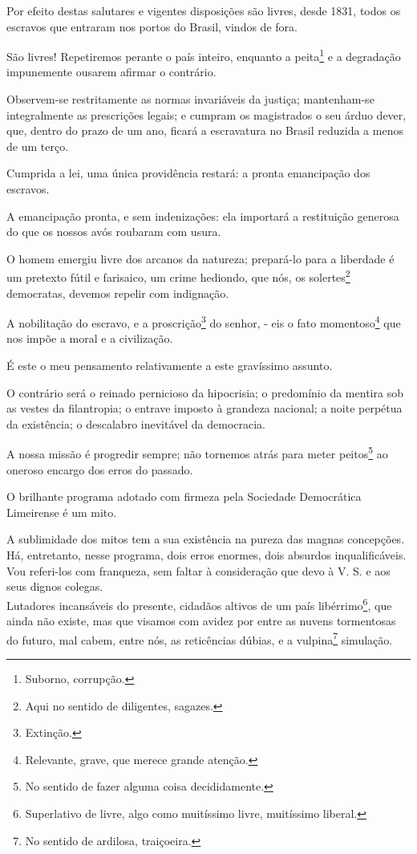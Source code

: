 Por efeito destas salutares e vigentes disposições são livres, desde
1831, todos os escravos que entraram nos portos do Brasil, vindos de
fora.

São livres! Repetiremos perante o país inteiro, enquanto a
peita\footnote{Suborno, corrupção.} e a degradação impunemente ousarem
afirmar o contrário.

Observem-se restritamente as normas invariáveis da justiça; mantenham-se
integralmente as prescrições legais; e cumpram os magistrados o seu
árduo dever, que, dentro do prazo de um ano, ficará a escravatura no
Brasil reduzida a menos de um terço.

Cumprida a lei, uma única providência restará: a pronta emancipação dos
escravos.

A emancipação pronta, e sem indenizações: ela importará a restituição
generosa do que os nossos avós roubaram com usura.

O homem emergiu livre dos arcanos da natureza; prepará-lo para a
liberdade é um pretexto fútil e farisaico, um crime hediondo, que nós,
os solertes\footnote{Aqui no sentido de diligentes, sagazes.}
democratas, devemos repelir com indignação.

A nobilitação do escravo, e a proscrição\footnote{Extinção.} do
senhor, - eis o fato momentoso\footnote{Relevante, grave, que merece
  grande atenção.} que nos impõe a moral e a civilização.

É este o meu pensamento relativamente a este gravíssimo assunto.

O contrário será o reinado pernicioso da hipocrisia; o predomínio da
mentira sob as vestes da filantropia; o entrave imposto à grandeza
nacional; a noite perpétua da existência; o descalabro inevitável da
democracia.

A nossa missão é progredir sempre; não tornemos atrás para meter
peitos\footnote{No sentido de fazer alguma coisa decididamente.} ao
oneroso encargo dos erros do passado.

O brilhante programa adotado com firmeza pela Sociedade Democrática
Limeirense é um mito.

A sublimidade dos mitos tem a sua existência na pureza das magnas
concepções.\\
Há, entretanto, nesse programa, dois erros enormes, dois absurdos
inqualificáveis.\\
Vou referi-los com franqueza, sem faltar à consideração que devo à V. S.
e aos seus dignos colegas.\\
Lutadores incansáveis do presente, cidadãos altivos de um país
libérrimo\footnote{Superlativo de livre, algo como muitíssimo livre,
  muitíssimo liberal.}, que ainda não existe, mas que visamos com avidez
por entre as nuvens tormentosas do futuro, mal cabem, entre nós, as
reticências dúbias, e a vulpina\footnote{No sentido de ardilosa,
  traiçoeira.} simulação.

